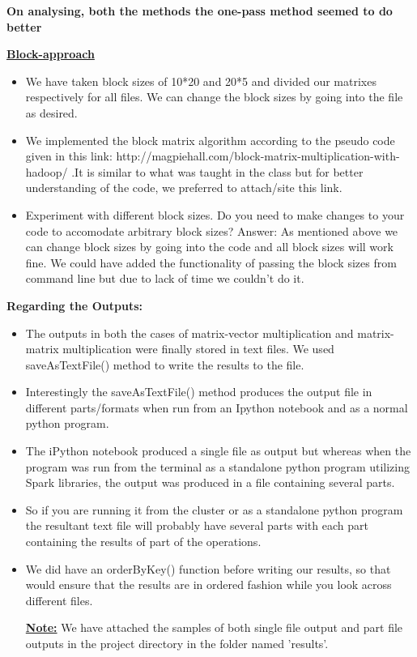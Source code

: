 \documentclass[11pt]{article}
\begin{document}
\begin{itemize}
\textbf{ On analysing, both the methods the one-pass method seemed to do better}


\textbf{\underline{Block-approach}}

\begin{itemize}
	
\item We have taken block sizes of 10*20 and 20*5 and divided our matrixes respectively for all files. We can change the block sizes by going into the file as desired.
\item We implemented the block matrix algorithm according to the pseudo code given in this link: http://magpiehall.com/block-matrix-multiplication-with-hadoop/ .It is similar to what was taught in the class but for better understanding of the code, we preferred to attach/site this link.
\item Experiment with different block sizes. Do you need to make changes to your code to accomodate arbitrary block sizes?
Answer: As mentioned above we can change block sizes by going into the code and all block sizes will work fine. We could have added the functionality of passing the block sizes from command line but due to lack of time we couldn't do it.

\end{itemize}


\textbf{ Regarding the Outputs:}

\begin{itemize}
	
\item The outputs in both the cases of matrix-vector multiplication and matrix-matrix multiplication were finally stored in text files. We used saveAsTextFile() method to write the results to the file.

\item Interestingly the saveAsTextFile() method produces the output file in different parts/formats when run from an Ipython notebook and as a normal python program.

\item The iPython notebook produced a single file as output but whereas when the program was run from the terminal as a standalone python program utilizing Spark libraries, the output was produced in a file containing several parts.

\item So if you are running it from the cluster or as a standalone python program the resultant text file will probably have several parts with each part containing the results of part of the operations.

\item We did have an orderByKey() function before writing our results, so that would ensure that the results are in ordered fashion while you look across different files.

\textbf{\underline{Note:}} We have attached the samples of both single file output and part file outputs in the project directory in the folder named 'results'.
\end{itemize}

\end{itemize}
\end{document}
